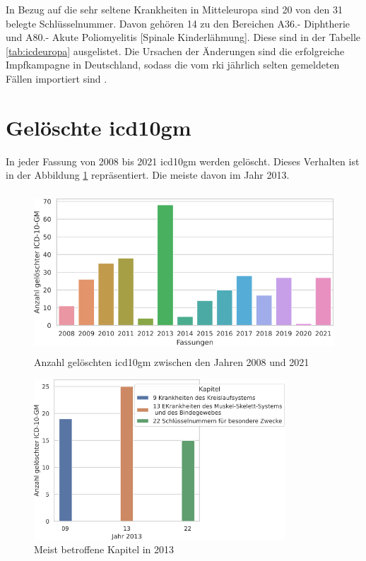 In Bezug auf die sehr seltene Krankheiten in Mitteleuropa sind \textsf{20} von den \textsf{31} belegte Schlüsselnummer. Davon gehören \textsf{14} zu den Bereichen \textsf{A36.-} \textsf{Diphtherie} und \textsf{A80.-} \textsf{Akute Poliomyelitis [Spinale Kinderlähmung]}. Diese sind in der Tabelle \ref{tab:icdeuropa} ausgelistet. Die Ursachen der Änderungen sind die erfolgreiche Impfkampagne in Deutschland, sodass die vom \ac{rki} jährlich selten gemeldeten Fällen importiert sind \cite{dippol1}.

\section{Gelöschte \acs{icd10gm}} \label{sec:deletedicd}

In jeder Fassung von 2008 bis 2021 \ac{icd10gm} werden gelöscht. Dieses Verhalten ist in der Abbildung \ref{fig:newdeleteoldicdyear} repräsentiert. Die meiste davon im Jahr 2013. 

\clearpage
\begin{figure}[ht]
	\centering
	\includegraphics[height=6cm]{figures/neuVersionDelete}
	\caption[Gelöschte \acs{icd10gm} pro Jahr]{Anzahl gelöschten \acs{icd10gm} zwischen den Jahren 2008 und 2021}
	\label{fig:newdeleteoldicdyear}
\end{figure} 


\begin{figure}[ht]
	\centering
	\includegraphics[height=6cm]{figures/kaptnr13}
	\caption{Meist betroffene Kapitel in 2013}
	\label{fig:kap13}
\end{figure}

